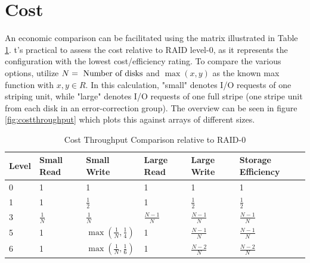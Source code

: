 \documentclass{article}
\begin{document}
\section{Cost}
An economic comparison can be facilitated using the matrix illustrated in Table \ref{tab:economics}.
t's practical to assess the cost relative to RAID level-0, as it represents the configuration with the 
lowest cost/efficiency rating. To compare the various options, utilize \( N = \textnormal{ Number of disks}\)
and \(\max\left(x,y\right)\) as the known max function with \( x, y \in R \).
In this calculation, "small" denotes I/O requests of one striping unit, while "large" 
denotes I/O requests of one full stripe (one stripe unit from each disk in an error-correction group). 
The overview can be seen in figure \ref{fig:costthroughput} which 
plots this against arrays of different sizes. \cite{cmu:raidhighperf}
\begin{table}[h]
    \begin{tabularx}{\textwidth}{l|X|X|X|X|X}
        \textbf{Level} &
        Small Read &
        Small Write &
        Large Read &
        Large Write &
        Storage Efficiency \\
        \hline
        0 & 1 & 1 & 1 & 1 & 1 \\
        1 & 1 & \( \frac{1}{2} \) & 1 & \( \frac{1}{2} \) & \( \frac{1}{2} \) \\
        3 & \( \frac{1}{N} \) & \( \frac{1}{N} \) & \( \frac{N-1}{N} \) & \( \frac{N-1}{N} \) & \( \frac{N-1}{N} \) \\
        5 & 1 & \( \max\left(\frac{1}{N},\frac{1}{4}\right) \) & 1 & \( \frac{N-1}{N} \) & \( \frac{N-1}{N} \) \\
        6 & 1 & \( \max\left(\frac{1}{N},\frac{1}{6}\right) \) & 1 & \( \frac{N-2}{N} \) & \( \frac{N-2}{N} \) \\
    \end{tabularx}
    \caption{Cost Throughput Comparison relative to RAID-0 \cite{cmu:raidhighperf}}
    \label{tab:economics}
\end{table}
\pagebreak
\end{document}
